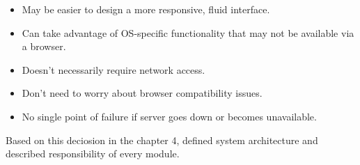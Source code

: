 \begin{itemize}
\item May be easier to design a more responsive, fluid interface.
\item Can take advantage of OS-specific functionality that may not be available via a browser.
\item Doesn't necessarily require network access.
\item Don't need to worry about browser compatibility issues.
\item No single point of failure if server goes down or becomes unavailable.
\end{itemize}

Based on this deciosion in the chapter 4, defined system architecture and described responsibility of every module. 